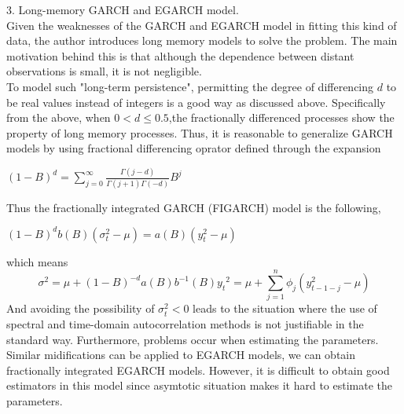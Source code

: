 \documentclass[10pt,a4paper]{article}
\begin{document}
3. Long-memory GARCH and EGARCH model.\\

Given the weaknesses of the GARCH and EGARCH model in fitting this kind of data, the author introduces long memory models to solve the problem. The main motivation behind this is that although the dependence between distant observations is small, it is not negligible.\\
  To model such "long-term persistence", permitting the degree of differencing $d$ to be real values instead of integers is a good way as discussed above. Specifically from the above, when $0<d\leq 0.5$,the fractionally differenced processes show the property of long memory processes. Thus, it is reasonable to generalize GARCH models by using fractional differencing oprator defined through the expansion

\begin{center}$\displaystyle (1-B)^d=\sum_{j=0}^{\infty}\frac{\Gamma(j-d)}{\Gamma(j+1)\Gamma(-d)}B^j $\end{center}

Thus the fractionally integrated GARCH (FIGARCH) model is the following,

\begin{center}$\displaystyle (1-B)^db(B)(\sigma^2_t-\mu)=a(B)(y^2_t-\mu) $\end{center}
which means
$$\sigma^2=\mu+(1-B)^{-d}a(B)b^{-1}(B){y_t}^2=\mu+\sum_{j=1}^{n}\phi_j(y_{t-1-j}^2-\mu)$$
And avoiding the possibility of $\sigma_t^2<0$ leads to the situation where the use of spectral and time-domain autocorrelation methods is not justifiable in the standard way. Furthermore, problems occur when estimating the parameters.\\
Similar midifications can be applied to EGARCH models, we can obtain fractionally integrated EGARCH models. However, it is difficult to obtain good estimators in this model since asymtotic situation makes it hard to estimate the parameters.
\end{document}
